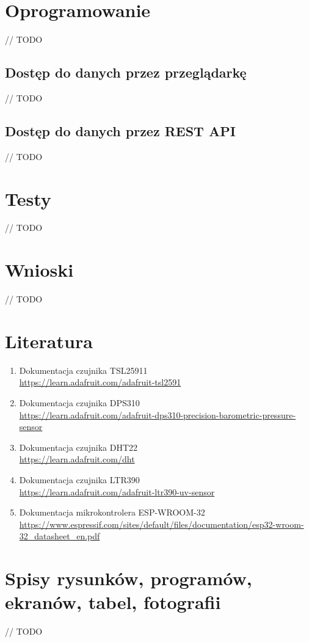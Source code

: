 \documentclass[12pt,a4paper]{article}
\begin{document}
\section{Oprogramowanie}
// TODO

\subsection{Dostęp do danych przez przeglądarkę}
// TODO

\subsection{Dostęp do danych przez REST API}
// TODO

\section{Testy}
// TODO

\section{Wnioski}
// TODO

\section{Literatura}

\begin{enumerate}
    \item Dokumentacja czujnika TSL25911\\
    \url{https://learn.adafruit.com/adafruit-tsl2591}
    \item Dokumentacja czujnika DPS310\\
    \url{https://learn.adafruit.com/adafruit-dps310-precision-barometric-pressure-sensor}
    \item Dokumentacja czujnika DHT22\\
    \url{https://learn.adafruit.com/dht}
    \item Dokumentacja czujnika LTR390\\
    \url{https://learn.adafruit.com/adafruit-ltr390-uv-sensor}
    \item Dokumentacja mikrokontrolera ESP-WROOM-32\\
    \url{https://www.espressif.com/sites/default/files/documentation/esp32-wroom-32_datasheet_en.pdf}
\end{enumerate}

\section{Spisy rysunków, programów, ekranów, tabel, fotografii}
// TODO
\end{document}
